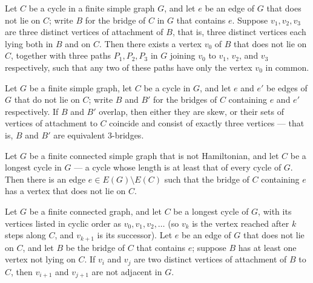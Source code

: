 \begin{theorem}
\label{SimpleGraph.bridge_tripod_of_three_attachments}
\leanok
{}
Let $C$ be a cycle in a finite simple graph $G$, and let $e$ be an edge of $G$ that does
not lie on $C$; write $B$ for the bridge of $C$ in $G$ that contains $e$. Suppose $v_1,
v_2, v_3$ are three distinct vertices of attachment of $B$, that is, three distinct
vertices each lying both in $B$ and on $C$. Then there exists a vertex $v_0$ of $B$ that
does not lie on $C$, together with three paths $P_1, P_2, P_3$ in $G$ joining $v_0$ to
$v_1$, $v_2$, and $v_3$ respectively, such that any two of these paths have only the
vertex $v_0$ in common.
\end{theorem}

\begin{theorem}
\label{SimpleGraph.overlap_imp_skew_or_equivalent_three_bridge}
\leanok
{}
Let $G$ be a finite simple graph, let $C$ be a cycle in $G$, and let $e$ and $e'$ be
edges of $G$ that do not lie on $C$; write $B$ and $B'$ for the bridges of $C$
containing $e$ and $e'$ respectively. If $B$ and $B'$ overlap, then either they are
skew, or their sets of vertices of attachment to $C$ coincide and consist of exactly
three vertices — that is, $B$ and $B'$ are equivalent $3$-bridges.
\end{theorem}

\begin{theorem}
\label{SimpleGraph.exists_bridge_off_longest_cycle}
\leanok
{}
Let $G$ be a finite connected simple graph that is not Hamiltonian, and let $C$ be a
longest cycle in $G$ — a cycle whose length is at least that of every cycle of $G$. Then
there is an edge $e \in E(G) \setminus E(C)$ such that the bridge of $C$ containing $e$
has a vertex that does not lie on $C$.
\end{theorem}

\begin{theorem}
\label{SimpleGraph.succ_attachments_not_adj}
\leanok
{}
Let $G$ be a finite connected graph, and let $C$ be a longest cycle of $G$, with its
vertices listed in cyclic order as $v_0, v_1, v_2, \dots$ (so $v_k$ is the vertex
reached after $k$ steps along $C$, and $v_{k+1}$ is its successor). Let $e$ be an edge
of $G$ that does not lie on $C$, and let $B$ be the bridge of $C$ that contains $e$;
suppose $B$ has at least one vertex not lying on $C$. If $v_i$ and $v_j$ are two
distinct vertices of attachment of $B$ to $C$, then $v_{i+1}$ and $v_{j+1}$ are not
adjacent in $G$.
\end{theorem}

